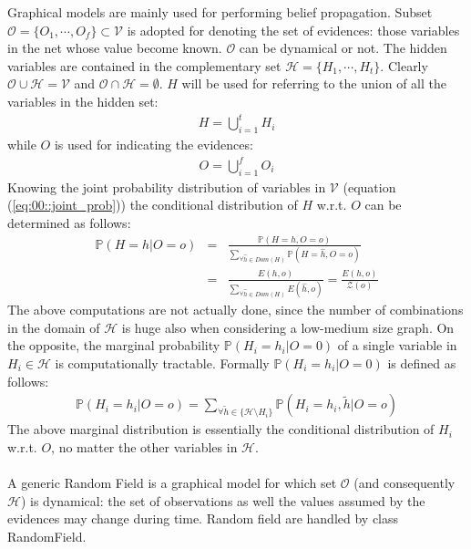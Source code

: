 Graphical models are mainly used for performing belief propagation. Subset $\mathcal{O}=\lbrace O_1 , \cdots, O_f \rbrace \subset \mathcal{V}$ is adopted for denoting the set of evidences: those variables in the net whose value become known. $\mathcal{O}$  can be dynamical or not. The hidden variables are contained in the complementary set $\mathcal{H}=\lbrace H_1 , \cdots, H_t \rbrace$. Clearly $\mathcal{O} \cup \mathcal{H} = \mathcal{V}$ and $ \mathcal{O} \cap \mathcal{H} = \emptyset$.  
$H$ will be used for referring to the union of all the variables in the hidden set:
\begin{eqnarray}
H = \bigcup_{i=1}^{t} H_i
\end{eqnarray}
while $O$ is used for indicating the evidences:
\begin{eqnarray}
O = \bigcup_{i=1}^{f} O_i
\end{eqnarray}
Knowing the joint probability distribution of variables in $\mathcal{V}$ (equation (\ref{eq:00::joint_prob})) the conditional distribution of $H$ w.r.t. 
$O$ can be determined as follows:
\begin{eqnarray}
\mathbb{P}(H=h | O=o) &=& \frac{ \mathbb{P}(H=h , O=o) }{  \sum _{\forall \hat{h} \in Dom(H) } \mathbb{P}(H=\hat{h} , O=o)} \nonumber\\
					  &=& \frac{ E(h,o) }{ \sum _{\forall \hat{h} \in Dom(H)} E(\hat{h}, o) } = \frac{ E(h,o)}{ \mathcal{Z}(o)}
					  \label{eq:00:cond_prob}
\end{eqnarray}
The above computations are not actually done, since the number of combinations in the domain of  $\mathcal{H}$ is huge also when considering a low-medium size graph.
On the opposite, the marginal probability $\mathbb{P}(H_i = h_i | O = 0)$ of a single variable in $H_i \in \mathcal{H}$ is computationally tractable.
Formally $\mathbb{P}(H_i = h_i | O = 0)$ is defined as follows:
\begin{eqnarray}
\mathbb{P}(H_i = h_i | O = o) = \sum _{\forall \tilde{h} \in \lbrace \mathcal{H} \setminus H_i \rbrace} \mathbb{P}(H_i = h_i, \tilde{h} | O = o )
\end{eqnarray}
The above marginal distribution is essentially the conditional distribution of $H_i$ w.r.t. $O$, no matter the other variables in $\mathcal{H}$. 
\\
\\
A generic Random Field is a graphical model for which set $\mathcal{O}$ (and consequently $\mathcal{H}$) is dynamical: the set of observations as well the values assumed by the evidences may change during time. Random field are handled by class RandomField.
